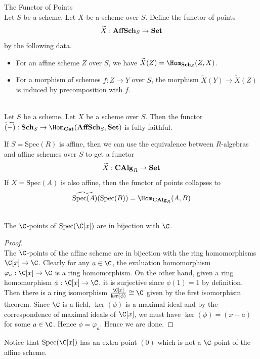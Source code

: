 \documentclass[a4paper]{article}
\begin{document}
\begin{defn}{The Functor of Points}{}\\
Let $S$ be a scheme. Let $X$ be a scheme over $S$. Define the functor of points $$\widetilde{X}:\bold{AffSch}_S\to\bold{Set}$$ by the following data. 
\begin{itemize}
\item For an affine scheme $Z$ over $S$, we have $\widetilde{X}(Z)=\Hom_{\bold{Sch}_S}(Z,X)$. 
\item For a morphism of schemes $f:Z\to Y$ over $S$, the morphism $\widetilde{X}(Y)\to\widetilde{X}(Z)$ is induced by precomposition with $f$. 
\end{itemize}
\end{defn}

\begin{prp}{}{}\\
Let $S$ be a scheme. Let $X$ be a scheme over $S$. Then the functor $\widetilde{(-)}:\bold{Sch}_S\to\Hom_{\bold{Cat}}(\bold{AffSch}_S,\bold{Set})$ is fully faithful. 
\end{prp}

If $S=\text{Spec}(R)$ is affine, then we can use the equivalence between $R$-algebras and affine schemes over $S$ to get a functor $$\widetilde{X}:\bold{CAlg}_R\to\bold{Set}$$ If $X=\text{Spec}(A)$ is also affine, then the functor of points collapses to $$\widetilde{\text{Spec}(A)}(\text{Spec}(B))=\Hom_{\bold{CAlg}_R}(A,B)$$

\begin{eg}{}{}\\
The $\C$-points of $\text{Spec}(\C[x])$ are in bijection with $\C$. 
\begin{proof}\\
The $\C$-points of the affine scheme are in bijection with the ring homomorphisms $\C[x]\to\C$. Clearly for any $a\in\C$, the evaluation homomorphism $\varphi_a:\C[x]\to\C$ is a ring homomorphism. On the other hand, given a ring homomorphism $\phi:\C[x]\to\C$, it is surjective since $\phi(1)=1$ by definition. Then there is a ring isomorphism $\frac{\C[x]}{\ker(\phi)}\cong\C$ given by the first isomorphism theorem. Since $\C$ is a field, $\ker(\phi)$ is a maximal ideal and by the correspondence of maximal ideals of $\C[x]$, we must have $\ker(\phi)=(x-a)$ for some $a\in\C$. Hence $\phi=\varphi_a$. Hence we are done. 
\end{proof}
\end{eg}

Notice that $\text{Spec}(\C[x])$ has an extra point $(0)$ which is not a $\C$-point of the affine scheme. 
\end{document}
